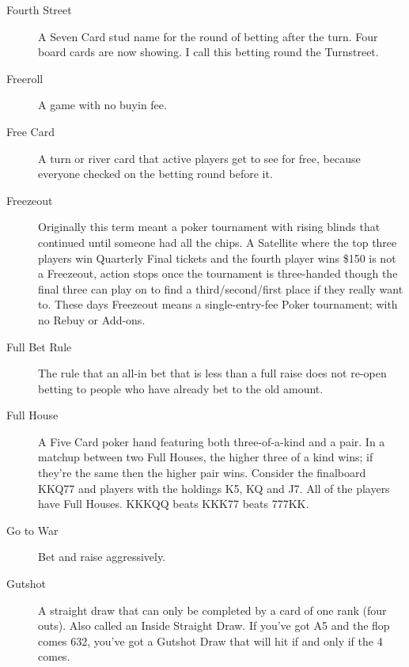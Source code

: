 \begin{description}
\item[Fourth Street] A Seven Card stud name for the round of betting
after the turn. Four board cards are now showing. I call this betting
round the Turnstreet.

\item[Freeroll] A game with no buyin fee.

\item[Free Card] A turn or river card that active players get to see
for free, because everyone checked on the betting round before it.

\item[Freezeout] Originally this term meant a poker tournament with
rising blinds that continued until someone had all the chips. A
Satellite where the top three players win Quarterly Final tickets and
the fourth player wins \$150 is not a Freezeout, action stops once the
tournament is three-handed though the final three can play on to find
a third/second/first place if they really want to. These days
Freezeout means a single-entry-fee Poker tournament; with no Rebuy or
Add-ons.


\item[Full Bet Rule] The rule that an all-in bet that is less than a
full raise does not re-open betting to people who have already bet to
the old amount.

\item[Full House] A Five Card poker hand featuring both
three-of-a-kind and a pair. In a matchup between two Full Houses, the
higher three of a kind wins; if they're the same then the higher pair
wins. Consider the finalboard KKQ77 and players with the holdings K5,
KQ and J7. All of the players have Full Houses. KKKQQ beats KKK77
beats 777KK.

\item[Go to War] Bet and raise aggressively.

\item[Gutshot] A straight draw that can only be completed by a card of
one rank (four outs). Also called an Inside Straight Draw. If you've
got A5 and the flop comes 632, you've got a Gutshot Draw that will hit
if and only if the 4 comes.


\end{description}
